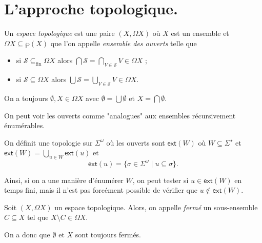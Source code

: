 \documentclass[./main]{subfiles}
\begin{document}

  \chapter{L'approche topologique.}

  \begin{defn}
    Un \textit{espace topologique} est une paire $(X, \Omega X)$ où $X$ est un ensemble et $\Omega X \subseteq \wp(X)$ que l'on appelle \textit{ensemble des ouverts} telle que
    \begin{itemize}
      \item si $\mathcal{S} \subseteq_\mathrm{fin} \Omega X$ alors $\bigcap \mathcal{S} = \bigcap_{V \in \mathcal{S}} V \in \Omega X$ ;
      \item si $\mathcal{S} \subseteq \Omega X$ alors $\bigcup \mathcal{S} = \bigcup_{V \in \mathcal{S}} V \in \Omega X$.
    \end{itemize}
  \end{defn}

  \begin{rmk}
    On a toujours $\emptyset, X \in \Omega X$ avec $\emptyset = \bigcup \emptyset$ et $X = \bigcap \emptyset$.
  \end{rmk}

  \begin{exm}
    On peut voir les ouverts comme "analogues" aux ensembles récursivement énumérables.

    On définit une topologie  sur $\Sigma^\omega$ où les ouverts sont  $\mathsf{ext}(W)$ où $W \subseteq \Sigma^\star$ et $\mathsf{ext}(W) = \bigcup_{u \in W} \mathsf{ext}(u)$ et 
    \[
    \mathsf{ext}(u) = \{\sigma \in \Sigma^\omega  \mid u \subseteq \sigma\} 
    .\]

    Ainsi, si on a une manière d'énumérer $W$, on peut tester si $u \in \mathsf{ext}(W)$ en temps fini, mais il n'est pas forcément possible de vérifier que $u \not\in \mathsf{ext}(W)$.
  \end{exm}

  \begin{defn}
    Soit $(X, \Omega X)$ un espace topologique.
    Alors, on appelle \textit{fermé} un sous-ensemble $C \subseteq X$ tel que $X \setminus C \in \Omega X$.
  \end{defn}

  \begin{rmk}
    On a donc que $\emptyset$ et $X$ sont toujours fermés.
  \end{rmk}
\end{document}
